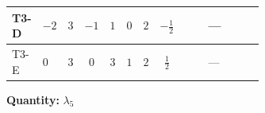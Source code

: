 \documentclass[8pt]{article}
\begin{document}
\begin{landscape}
\begin{longtable}{@{}llcccccc >{\raggedright\arraybackslash}p{0.21\linewidth} >{\raggedright\arraybackslash}p{0.21\linewidth} >{\raggedright\arraybackslash}p{0.21\linewidth}@{}}
\midrule
T3-D & $-2$ & $3$ & $-1$ & $1$ & $0$ & $2$ & $-\frac{1}{2}$ & \scriptsize\adjustbox{max width=\linewidth}{$\begin{gathered} +4 {\lambda_{HS_2}^{(1)}} {\lambda_5}\end{gathered}$} & --- & \scriptsize\adjustbox{max width=\linewidth}{$\begin{gathered} -\frac{21 {g_2}^2 {\lambda_5}}{2}\end{gathered}$} \\
\midrule
T3-E & $0$ & $3$ & $0$ & $3$ & $1$ & $2$ & $\frac{1}{2}$ & \scriptsize\adjustbox{max width=\linewidth}{$\begin{gathered} +4 {\lambda_{HS_2}^{(1)}} {\lambda_5}\end{gathered}$} & --- & \scriptsize\adjustbox{max width=\linewidth}{$\begin{gathered} -\frac{33 {g_2}^2 {\lambda_5}}{2}\end{gathered}$} \\
\midrule
\bottomrule
\end{longtable}
\clearpage
\noindent\textbf{Quantity: }$\lambda_5$\par\smallskip

\end{landscape}
\end{document}
